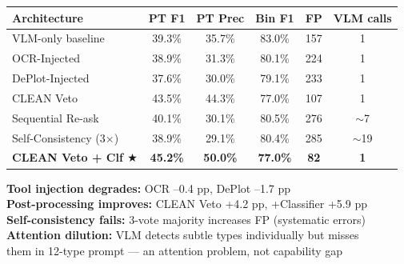 \documentclass[border=8pt]{standalone}
\begin{document}
\begin{minipage}{16cm}
\begin{tcolorbox}[colback=dgreen!5, colframe=dgreen, arc=6pt,
  title={\large\bfseries Pipeline Ablation Results (RQ3)},
  fonttitle=\color{white}, coltitle=white, colbacktitle=dgreen]
\centering
\renewcommand{\arraystretch}{1.3}
\begin{tabular}{lccccc}
\toprule
\textbf{Architecture} & \textbf{PT F1} & \textbf{PT Prec} & \textbf{Bin F1} & \textbf{FP} & \textbf{VLM calls} \\
\midrule
VLM-only baseline & 39.3\% & 35.7\% & 83.0\% & 157 & 1 \\
\rowcolor{lred}
\textcolor{dred}{OCR-Injected} & \textcolor{dred}{38.9\%} & \textcolor{dred}{31.3\%} & \textcolor{dred}{80.1\%} & \textcolor{dred}{224} & \textcolor{dred}{1} \\
\rowcolor{lred}
\textcolor{dred}{DePlot-Injected} & \textcolor{dred}{37.6\%} & \textcolor{dred}{30.0\%} & \textcolor{dred}{79.1\%} & \textcolor{dred}{233} & \textcolor{dred}{1} \\
\rowcolor{lgreen}
CLEAN Veto & 43.5\% & 44.3\% & 77.0\% & 107 & 1 \\
Sequential Re-ask & 40.1\% & 30.1\% & 80.5\% & 276 & $\sim$7 \\
Self-Consistency (3$\times$) & 38.9\% & 29.1\% & 80.4\% & 285 & $\sim$19 \\
\rowcolor{lgreen}
\textcolor{dgreen}{\textbf{CLEAN Veto + Clf $\bigstar$}} & \textcolor{dgreen}{\textbf{45.2\%}} & \textcolor{dgreen}{\textbf{50.0\%}} & \textcolor{dgreen}{\textbf{77.0\%}} & \textcolor{dgreen}{\textbf{82}} & \textcolor{dgreen}{\textbf{1}} \\
\bottomrule
\end{tabular}

\vspace{8pt}
\begin{flushleft}
\textcolor{dred}{\textbf{Tool injection degrades:}} OCR --0.4 pp, DePlot --1.7 pp\\[3pt]
\textcolor{dgreen}{\textbf{Post-processing improves:}} CLEAN Veto +4.2 pp, +Classifier +5.9 pp\\[3pt]
\textbf{Self-consistency fails:} 3-vote majority increases FP (systematic errors)\\[3pt]
\textbf{Attention dilution:} VLM detects subtle types individually but misses\\
\quad them in 12-type prompt --- an attention problem, not capability gap
\end{flushleft}
\end{tcolorbox}


\end{minipage}
\end{document}
